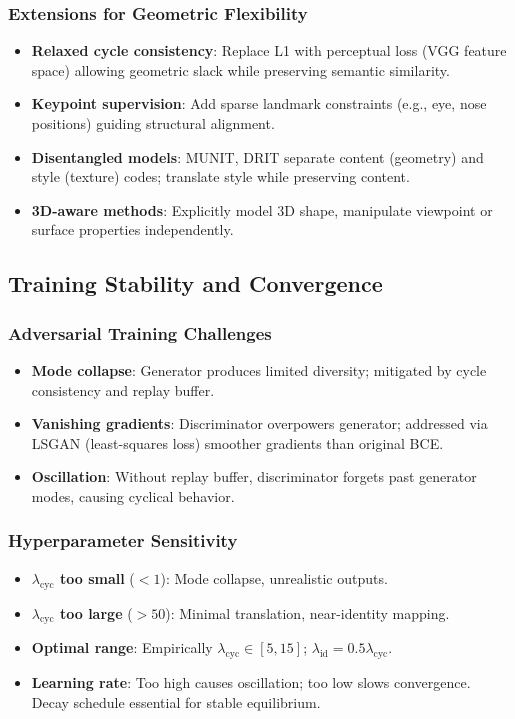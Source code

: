 \documentclass[11pt]{article}
\begin{document}
\subsubsection{Extensions for Geometric Flexibility}
\begin{itemize}
\item \textbf{Relaxed cycle consistency}: Replace L1 with perceptual loss (VGG feature space) allowing geometric slack while preserving semantic similarity.
\item \textbf{Keypoint supervision}: Add sparse landmark constraints (e.g., eye, nose positions) guiding structural alignment.
\item \textbf{Disentangled models}: MUNIT, DRIT separate content (geometry) and style (texture) codes; translate style while preserving content.
\item \textbf{3D-aware methods}: Explicitly model 3D shape, manipulate viewpoint or surface properties independently.
\end{itemize}

\subsection{Training Stability and Convergence}
\subsubsection{Adversarial Training Challenges}
\begin{itemize}
\item \textbf{Mode collapse}: Generator produces limited diversity; mitigated by cycle consistency and replay buffer.
\item \textbf{Vanishing gradients}: Discriminator overpowers generator; addressed via LSGAN (least-squares loss) smoother gradients than original BCE.
\item \textbf{Oscillation}: Without replay buffer, discriminator forgets past generator modes, causing cyclical behavior.
\end{itemize}

\subsubsection{Hyperparameter Sensitivity}
\begin{itemize}
\item \textbf{$\lambda_{\text{cyc}}$ too small} ($<1$): Mode collapse, unrealistic outputs.
\item \textbf{$\lambda_{\text{cyc}}$ too large} ($>50$): Minimal translation, near-identity mapping.
\item \textbf{Optimal range}: Empirically $\lambda_{\text{cyc}} \in [5, 15]$; $\lambda_{\text{id}} = 0.5 \lambda_{\text{cyc}}$.
\item \textbf{Learning rate}: Too high causes oscillation; too low slows convergence. Decay schedule essential for stable equilibrium.
\end{itemize}
\end{document}
